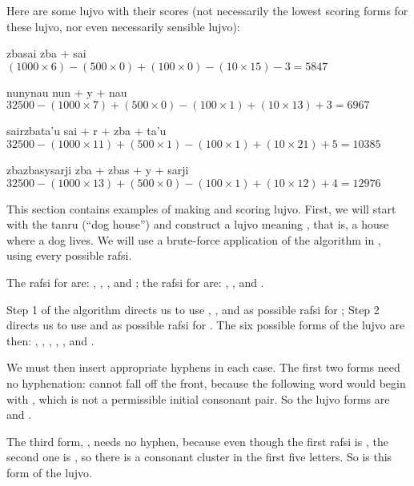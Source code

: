Here are some lujvo with their scores (not necessarily the lowest scoring forms for these lujvo, nor even necessarily sensible lujvo):
\begin{example}
zbasai\n
zba + sai\n
$(1000 \times 6) - (500 \times 0) + (100 \times 0) - (10 \times 15) - 3 = 5847$
\end{example}

\begin{example}
nunynau\n
nun + y + nau\n
$32500 - (1000 \times 7) + (500 \times 0) - (100 \times 1) + (10 \times 13) + 3 = 6967$
\end{example}

\begin{example}
sairzbata'u\n
sai + r + zba + ta'u\n
$32500 - (1000 \times 11) + (500 \times 1) - (100 \times 1) + (10 \times 21) + 5 = 10385$
\end{example}

\begin{example}
zbazbasysarji\n
zba + zbas + y + sarji  \n
$32500 - (1000 \times 13) + (500 \times 0) - (100 \times 1) + (10 \times 12) + 4 = 12976$
\end{example}



This section contains examples of making and scoring lujvo. First, we will start with the tanru  (``dog house'') and construct a lujvo meaning , that is, a house where a dog lives. We will use a brute-force application of the algorithm in , using every possible rafsi.

The rafsi for  are: , , , and ; the rafsi for  are: , , and .

Step 1 of the algorithm directs us to use , , and  as possible rafsi for ; Step 2 directs us to use  and  as possible rafsi for . The six possible forms of the lujvo are then: , , , , , and .

We must then insert appropriate hyphens in each case. The first two forms need no hyphenation:  cannot fall off the front, because the following word would begin with , which is not a permissible initial consonant pair. So the lujvo forms are  and .

The third form, , needs no hyphen, because even though the first rafsi is , the second one is , so there is a consonant cluster in the first five letters. So  is this form of the lujvo.

